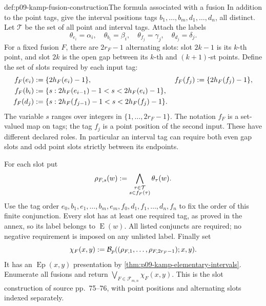 \begin{hbmethod}{def:p09-kamp-fusion-construction}{The formula associated with a fusion}
In addition to the point tags, give the interval positions tags
\(b_1,\ldots,b_m,d_1,\ldots,d_n\), all distinct. Let \(\mathcal T\)
be the set of all point and interval tags. Attach the labels
\[
 \theta_{e_i}=\alpha_i,\quad \theta_{b_i}=\beta_i,\quad
 \theta_{f_j}=\gamma_j,\quad \theta_{d_j}=\delta_j.
\]
For a fixed fusion \(F\), there are \(2r_F-1\) alternating slots:
slot \(2k-1\) is its \(k\)-th point, and slot \(2k\) is the open
gap between its \(k\)-th and \((k+1)\)-st points. Define the set of
slots required by each input tag:
\[
\begin{aligned}
 f_F(e_i)&\mathrel{:=}\{2h_F(e_i)-1\},&
 f_F(f_j)&\mathrel{:=}\{2h_F(f_j)-1\},\\
 f_F(b_i)&\mathrel{:=}
   \{s:2h_F(e_{i-1})-1<s<2h_F(e_i)-1\},\\
 f_F(d_j)&\mathrel{:=}
   \{s:2h_F(f_{j-1})-1<s<2h_F(f_j)-1\}.
\end{aligned}
\]
The variable \(s\) ranges over integers in \(\{1,\ldots,2r_F-1\}\).
The notation \(f_F\) is a set-valued map on tags; the tag \(f_j\)
is a point position of the second input. These have different declared
roles. In particular an interval tag can require both even gap slots and
odd point slots strictly between its endpoints.

For each slot put
\[
 \rho_{F,s}(w)\mathrel{:=}
       \bigwedge_{\substack{\tau\in\mathcal T\\s\in f_F(\tau)}}\theta_\tau(w).
\]
Use the tag order
\(e_0,b_1,e_1,\ldots,b_m,e_m,f_0,d_1,f_1,\ldots,d_n,f_n\)
to fix the order of this finite conjunction.
Every slot has at least one required tag, as proved in the annex, so its
label belongs to \(\operatorname{E}(w)\). All listed conjuncts are
required; no negative requirement is imposed on any unlisted label.
Finally set
\[
 \chi_F(x,y)\mathrel{:=}
  \mathcal B_p((\rho_{F,1},\ldots,\rho_{F,2r_F-1});x,y).
\]
It has an \(\operatorname{Ep}(x,y)\) presentation by
\cref{thm:p09-kamp-elementary-intervals}. Enumerate all fusions and
return \(\bigvee_{F\in\mathcal F_{m,n}}\chi_F(x,y)\).
This is the slot construction of source pp.~75--76, with point positions
and alternating slots indexed separately.
\end{hbmethod}

